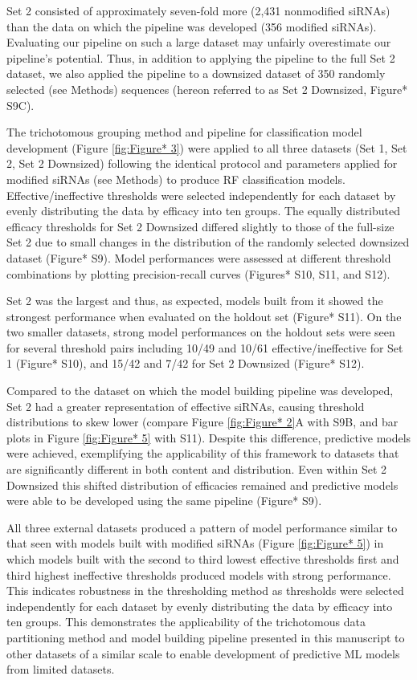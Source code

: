 \documentclass{report}
\begin{document}
 Set 2 consisted of approximately seven-fold more (2,431 nonmodified siRNAs) than the data on which the pipeline was developed (356 modified siRNAs). Evaluating our pipeline on such a large dataset may unfairly overestimate our pipeline’s potential. Thus, in addition to applying the pipeline to the full Set 2 dataset, we also applied the pipeline to a downsized dataset of 350 randomly selected (see Methods) sequences (hereon referred to as Set 2 Downsized, Figure* S9C).

 The trichotomous grouping method and pipeline for classification model development (Figure \ref{fig:Figure* 3}) were applied to all three datasets (Set 1, Set 2, Set 2 Downsized) following the identical protocol and parameters applied for modified siRNAs (see Methods) to produce RF classification models. Effective/ineffective thresholds were selected independently for each dataset by evenly distributing the data by efficacy into ten groups. The equally distributed efficacy thresholds for Set 2 Downsized differed slightly to those of the full-size Set 2 due to small changes in the distribution of the randomly selected downsized dataset (Figure* S9). Model performances were assessed at different threshold combinations by plotting precision-recall curves (Figures* S10, S11, and S12). 

 Set 2 was the largest and thus, as expected, models built from it showed the strongest performance when evaluated on the holdout set (Figure* S11). On the two smaller datasets, strong model performances on the holdout sets were seen for several threshold pairs including 10/49 and 10/61 effective/ineffective for Set 1 (Figure* S10), and 15/42 and 7/42 for Set 2 Downsized (Figure* S12). 

 Compared to the dataset on which the model building pipeline was developed, Set 2 had a greater representation of effective siRNAs, causing threshold distributions to skew lower (compare Figure \ref{fig:Figure* 2}A with S9B, and bar plots in Figure \ref{fig:Figure* 5} with S11). Despite this difference, predictive models were achieved, exemplifying the applicability of this framework to datasets that are significantly different in both content and distribution. Even within Set 2 Downsized this shifted distribution of efficacies remained and predictive models were able to be developed using the same pipeline (Figure* S9). 

 All three external datasets produced a pattern of model performance similar to that seen with models built with modified siRNAs (Figure \ref{fig:Figure* 5}) in which models built with the second to third lowest effective thresholds first and third highest ineffective thresholds produced models with strong performance. This indicates robustness in the thresholding method as thresholds were selected independently for each dataset by evenly distributing the data by efficacy into ten groups. This demonstrates the applicability of the trichotomous data partitioning method and model building pipeline presented in this manuscript to other datasets of a similar scale to enable development of predictive ML models from limited datasets. 
\end{document}

